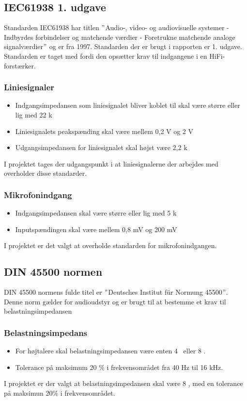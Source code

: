 \subsection*{IEC61938 1. udgave}
\label{IEC61938}
Standarden IEC61938 har titlen $"$Audio-, video- og audiovisuelle systemer - Indbyrdes forbindelser og matchende værdier - Foretrukne matchende analoge signalværdier$"$ og er fra 1997. Standarden der er brugt i rapporten er 1. udgave. Standarden er taget med fordi den opsætter krav til indgangene i en HiFi-forstærker\cite{IEC61938}. 

\subsubsection*{Liniesignaler} 
\begin{itemize}
\item Indgangsimpedansen som liniesignalet bliver koblet til skal være større eller lig med 22 k\ohm 
\item Liniesignalets peakspænding skal være mellem 0,2 V og 2 V
\item Udgangsimpedansen for liniesignalet skal højst være 2,2 k\ohm
\end{itemize}
I projektet tages der udgangspunkt i at liniesignalerne der arbejdes med overholder disse standarder.

\subsubsection*{Mikrofonindgang}
\begin{itemize}
\item Indgangsimpedansen skal være større eller lig med 5 k\ohm
\item Inputspændingen skal være mellem 0,8 mV og 200 mV
\end{itemize}
I projektet er det valgt at overholde standarden for mikrofonindgangen.

\subsection*{DIN 45500 normen}
\label{DIN45500}
DIN 45500 normens fulde titel er $"$Deutsches Institut f\"{u}r Normung 45500$"$. Denne norm gælder for audioudstyr og er brugt til at bestemme et krav til belastningsimpedansen

\subsubsection*{Belastningsimpedans}
\begin{itemize}
\item For højtalere skal belastningsimpedansen være enten 4 \ohm~eller 8 \ohm.
\item Tolerance på maksimum 20 \% i frekvensområdet fra 40 Hz til 16 kHz.
\end{itemize}
I projektet er der valgt at belastningsimpedansen skal være 8 \ohm, med en tolerance på maksimun 20\% i frekvensområdet.
